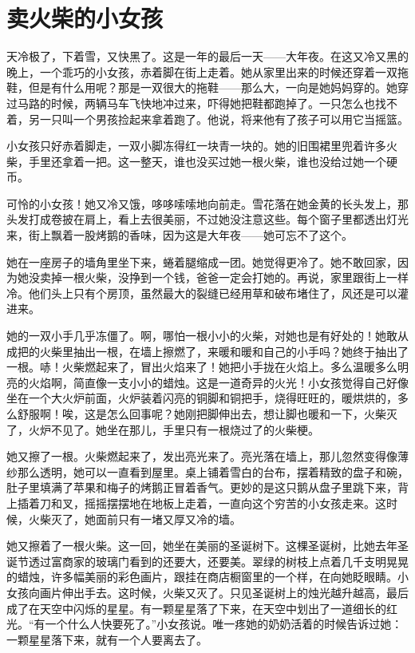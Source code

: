 \documentclass[12pt,UTF-8,openany]{ctexbook}
\begin{document}
\chapter{卖火柴的小女孩}

\begin{large}
    
    天冷极了，下着雪，又快黑了。这是一年的最后一天——大年夜。在这又冷又黑的晚上，一个乖巧的小女孩，赤着脚在街上走着。她从家里出来的时候还穿着一双拖鞋，但是有什么用呢？那是一双很大的拖鞋——那么大，一向是她妈妈穿的。她穿过马路的时候，两辆马车飞快地冲过来，吓得她把鞋都跑掉了。一只怎么也找不着，另一只叫一个男孩捡起来拿着跑了。他说，将来他有了孩子可以用它当摇篮。
    
    小女孩只好赤着脚走，一双小脚冻得红一块青一块的。她的旧围裙里兜着许多火柴，手里还拿着一把。这一整天，谁也没买过她一根火柴，谁也没给过她一个硬币。
    
    可怜的小女孩！她又冷又饿，哆哆嗦嗦地向前走。雪花落在她金黄的长头发上，那头发打成卷披在肩上，看上去很美丽，不过她没注意这些。每个窗子里都透出灯光来，街上飘着一股烤鹅的香味，因为这是大年夜——她可忘不了这个。
    
    她在一座房子的墙角里坐下来，蜷着腿缩成一团。她觉得更冷了。她不敢回家，因为她没卖掉一根火柴，没挣到一个钱，爸爸一定会打她的。再说，家里跟街上一样冷。他们头上只有个房顶，虽然最大的裂缝已经用草和破布堵住了，风还是可以灌进来。
    
    她的一双小手几乎冻僵了。啊，哪怕一根小小的火柴，对她也是有好处的！她敢从成把的火柴里抽出一根，在墙上擦燃了，来暖和暖和自己的小手吗？她终于抽出了一根。哧！火柴燃起来了，冒出火焰来了！她把小手拢在火焰上。多么温暖多么明亮的火焰啊，简直像一支小小的蜡烛。这是一道奇异的火光！小女孩觉得自己好像坐在一个大火炉前面，火炉装着闪亮的铜脚和铜把手，烧得旺旺的，暖烘烘的，多么舒服啊！唉，这是怎么回事呢？她刚把脚伸出去，想让脚也暖和一下，火柴灭了，火炉不见了。她坐在那儿，手里只有一根烧过了的火柴梗。
    
    她又擦了一根。火柴燃起来了，发出亮光来了。亮光落在墙上，那儿忽然变得像薄纱那么透明，她可以一直看到屋里。桌上铺着雪白的台布，摆着精致的盘子和碗，肚子里填满了苹果和梅子的烤鹅正冒着香气。更妙的是这只鹅从盘子里跳下来，背上插着刀和叉，摇摇摆摆地在地板上走着，一直向这个穷苦的小女孩走来。这时候，火柴灭了，她面前只有一堵又厚又冷的墙。
    
    她又擦着了一根火柴。这一回，她坐在美丽的圣诞树下。这棵圣诞树，比她去年圣诞节透过富商家的玻璃门看到的还要大，还要美。翠绿的树枝上点着几千支明晃晃的蜡烛，许多幅美丽的彩色画片，跟挂在商店橱窗里的一个样，在向她眨眼睛。小女孩向画片伸出手去。这时候，火柴又灭了。只见圣诞树上的烛光越升越高，最后成了在天空中闪烁的星星。有一颗星星落了下来，在天空中划出了一道细长的红光。“有一个什么人快要死了。”小女孩说。唯一疼她的奶奶活着的时候告诉过她：一颗星星落下来，就有一个人要离去了。
    

\end{large}
\end{document}

